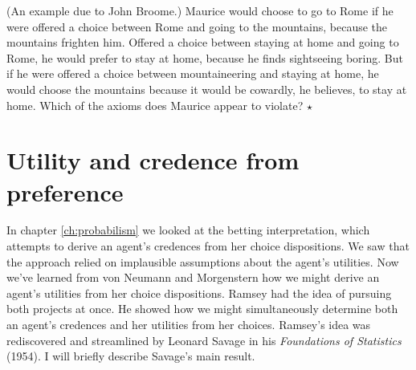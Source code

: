 
\begin{exercise}
  (An example due to John Broome.) Maurice would choose to go to Rome
  if he were offered a choice between Rome and going to the mountains,
  because the mountains frighten him. Offered a choice between staying
  at home and going to Rome, he would prefer to stay at home, because
  he finds sightseeing boring. But if he were offered a choice between
  mountaineering and staying at home, he would choose the mountains
  because it would be cowardly, he believes, to stay at home. Which of
  the axioms does Maurice appear to violate? $\star$
\end{exercise}


\section{Utility and credence from preference}

In chapter \ref{ch:probabilism} we looked at the betting
interpretation, which attempts to derive an agent's credences from her
choice dispositions. We saw that the approach relied on implausible
assumptions about the agent's utilities. Now we've learned from von
Neumann and Morgenstern how we might derive an agent's utilities from
her choice dispositions. Ramsey had the idea of pursuing both projects
at once. He showed how we might simultaneously determine both an
agent's credences and her utilities from her choices.%
%
%
Ramsey's idea was rediscovered and streamlined by Leonard Savage in
his \emph{Foundations of Statistics} (1954). I will briefly describe
Savage's main result.

